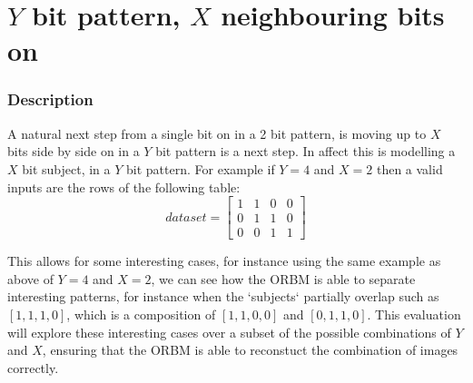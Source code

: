 %






\section{$Y$ bit pattern, $X$ neighbouring bits on}

\subsubsection{Description}
A natural next step from a single bit on in a 2 bit pattern, is moving up to $X$  bits side by side on in a $Y$ bit pattern is a next step. In affect this is modelling a $X$ bit subject, in a $Y$ bit pattern.
For example if $Y = 4 $ and $ X = 2 $ then a valid inputs are the rows of the following table:
\begin{equation}\label{eq:Example-xy-dataset} dataset =
\begin{bmatrix}
  1 & 1 & 0 & 0 \\
  0 & 1 & 1 & 0 \\
  0 & 0 & 1 & 1
\end{bmatrix}
\end{equation}

This allows for some interesting cases, for instance using the same example as above of $Y = 4 $ and $ X = 2 $, we can see how the ORBM is able to separate interesting patterns, for instance when the `subjects` partially overlap such as $[1,1,1,0]$, which is a composition of $[1,1,0,0]$ and $[0,1,1,0]$. This evaluation will explore these interesting cases over a subset of the possible combinations of $Y$ and $X$, ensuring that the ORBM is able to reconstuct the combination of images correctly.


